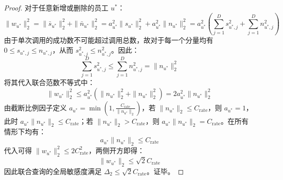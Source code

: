 \begin{proof}
对于任意新增或删除的员工 $u^*$：
\begin{equation}
  \|w_{u^*}\|_2^2 = \|\bar{s}_{u^*}\|_2^2 + \|\bar{n}_{u^*}\|_2^2 = a_{u^*}^2 \|s_{u^*}\|_2^2 + a_{u^*}^2 \|n_{u^*}\|_2^2 = a_{u^*}^2 \left( \sum_{j=1}^D s_{u^*, j}^2 + \sum_{j=1}^D n_{u^*, j}^2 \right)
\end{equation}
由于单次调用的成功数不可能超过调用总数，故对于每一个分量均有 $0 \le s_{u^*, j} \le n_{u^*, j}$，从而 $s_{u^*, j}^2 \le n_{u^*, j}^2$。因此：
\begin{equation}
  \sum_{j=1}^D s_{u^*, j}^2 \le \sum_{j=1}^D n_{u^*, j}^2 = \|n_{u^*}\|_2^2
\end{equation}
将其代入联合范数不等式中：
\begin{equation}
  \|w_{u^*}\|_2^2 \le a_{u^*}^2 \left( \|n_{u^*}\|_2^2 + \|n_{u^*}\|_2^2 \right) = 2 a_{u^*}^2 \|n_{u^*}\|_2^2
\end{equation}
由截断比例因子定义 $a_{u^*} = \min\left(1, \frac{C_{\text{rate}}}{\|n_{u^*}\|_2}\right)$，若 $\|n_{u^*}\|_2 \le C_{\text{rate}}$，则 $a_{u^*} = 1$，此时 $a_{u^*} \|n_{u^*}\|_2 \le C_{\text{rate}}$；若 $\|n_{u^*}\|_2 > C_{\text{rate}}$，则 $a_{u^*} \|n_{u^*}\|_2 = C_{\text{rate}}$。在所有情形下均有：
\begin{equation}
  a_{u^*} \|n_{u^*}\|_2 \le C_{\text{rate}}
\end{equation}
代入可得 $\|w_{u^*}\|_2^2 \le 2 C_{\text{rate}}^2$，两侧开方即得：
\begin{equation}
  \|w_{u^*}\|_2 \le \sqrt{2} C_{\text{rate}}
\end{equation}
因此联合查询的全局敏感度满足 $\Delta_2 \le \sqrt{2} C_{\text{rate}}$。证毕。
\end{proof}
